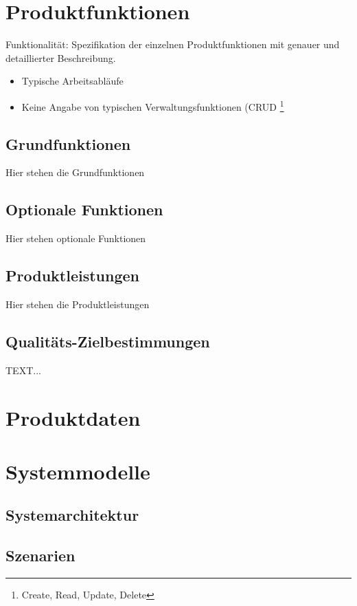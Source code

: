 \documentclass[a4paper]{scrreprt}
\begin{document}
\chapter{Produktfunktionen}
Funktionalität: Spezifikation der einzelnen Produktfunktionen mit genauer und detaillierter Beschreibung.

\begin{itemize}
  \item Typische Arbeitsabläufe
  \item Keine Angabe von typischen Verwaltungsfunktionen (CRUD \footnote{Create,
Read, Update, Delete}
\end{itemize}

\section{Grundfunktionen}
Hier stehen die Grundfunktionen

\section{Optionale Funktionen}
Hier stehen optionale Funktionen

\section{Produktleistungen}
Hier stehen die Produktleistungen

\section{Qualitäts-Zielbestimmungen}
TEXT...

\chapter{Produktdaten}

\chapter{Systemmodelle}
\section{Systemarchitektur}
\section{Szenarien}
\end{document}
